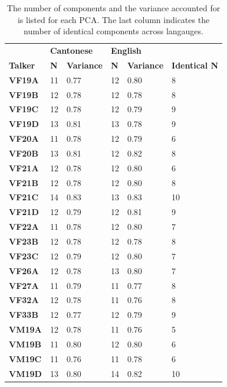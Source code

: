 \begin{table}[htbp]
    \caption{The number of components and the variance accounted for is listed for each PCA. The last column indicates the number of identical components across langauges.}
\label{ch3:tab:componentcount}
\centering
{\footnotesize 
    \begin{tabular}{llllll}
    
    \toprule
     & \multicolumn{2}{l}{\textbf{Cantonese}} & \multicolumn{2}{l}{\textbf{English}} &  \\
    \textbf{Talker} & \textbf{N} & \textbf{Variance} & \textbf{N} & \textbf{Variance} & \textbf{Identical N} \\
    \midrule
    \textbf{VF19A} & 11 & 0.77 & 12 & 0.80 & 8 \\
    \textbf{VF19B} & 12 & 0.78 & 12 & 0.78 & 8 \\
    \textbf{VF19C} & 12 & 0.78 & 12 & 0.79 & 9 \\
    \textbf{VF19D} & 13 & 0.81 & 13 & 0.78 & 9 \\
    \textbf{VF20A} & 11 & 0.78 & 12 & 0.79 & 6 \\
    \textbf{VF20B} & 13 & 0.81 & 12 & 0.82 & 8 \\
    \textbf{VF21A} & 12 & 0.78 & 12 & 0.80 & 6 \\
    \textbf{VF21B} & 12 & 0.78 & 12 & 0.80 & 8 \\
    \textbf{VF21C} & 14 & 0.83 & 13 & 0.83 & 10 \\
    \textbf{VF21D} & 12 & 0.79 & 12 & 0.81 & 9 \\
    \textbf{VF22A} & 11 & 0.78 & 12 & 0.80 & 7 \\
    \textbf{VF23B} & 12 & 0.78 & 12 & 0.78 & 8 \\
    \textbf{VF23C} & 12 & 0.79 & 12 & 0.80 & 7 \\
    \textbf{VF26A} & 12 & 0.78 & 13 & 0.80 & 7 \\
    \textbf{VF27A} & 11 & 0.79 & 11 & 0.77 & 8 \\
    \textbf{VF32A} & 12 & 0.78 & 11 & 0.76 & 8 \\
    \textbf{VF33B} & 12 & 0.77 & 12 & 0.79 & 9 \\
    \textbf{VM19A} & 12 & 0.78 & 11 & 0.76 & 5 \\
    \textbf{VM19B} & 11 & 0.80 & 12 & 0.80 & 6 \\
    \textbf{VM19C} & 11 & 0.76 & 11 & 0.78 & 6 \\
    \textbf{VM19D} & 13 & 0.80 & 14 & 0.82 & 10 \\

\end{tabular}}
\end{table}
